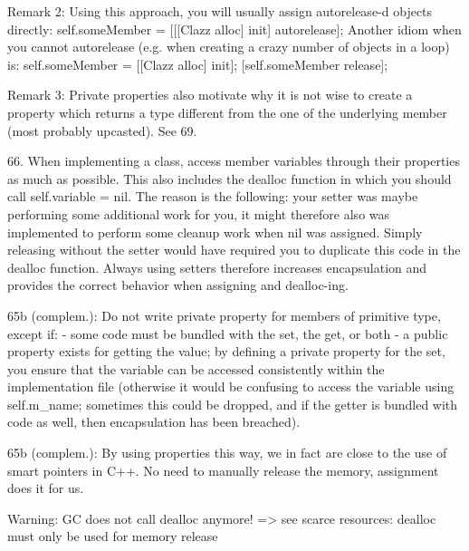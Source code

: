 Remark 2: Using this approach, you will usually assign autorelease-d objects
directly:
 self.someMember = [[[Clazz alloc] init] autorelease];
Another idiom when you cannot autorelease (e.g. when creating a crazy number
of objects in a loop) is:
 self.someMember = [[Clazz alloc] init];
 [self.someMember release];

Remark 3: Private properties also motivate why it is not wise to create a
property which returns a type different from the one of the underlying
member (most probably upcasted). See 69.

66. When implementing a class, access member variables through their
properties as much as possible. This also includes the dealloc function in
which you should call self.variable = nil. The reason is the following: your
setter was maybe performing some additional work for you, it might therefore
also was implemented to perform some cleanup work when nil was assigned.
Simply releasing without the setter would have required you to duplicate
this code in the dealloc function.
Always using setters therefore increases encapsulation and provides the
correct behavior when assigning and dealloc-ing.

65b (complem.): Do not write private property for members of primitive type,
except if:
- some code must be bundled with the set, the get, or both
- a public property exists for getting the value; by defining a private
property for the set, you ensure that the variable can be accessed
consistently within the implementation file (otherwise it would be confusing
to access the variable using self.m_name; sometimes this could be dropped,
and if the getter is bundled with code as well, then encapsulation has been
breached).

65b (complem.): By using properties this way, we in fact are close to
the use of smart pointers in C++. No need to manually release the
memory, assignment does it for us.

Warning: GC does not call dealloc anymore! => see scarce resources: dealloc must only be used for memory release



